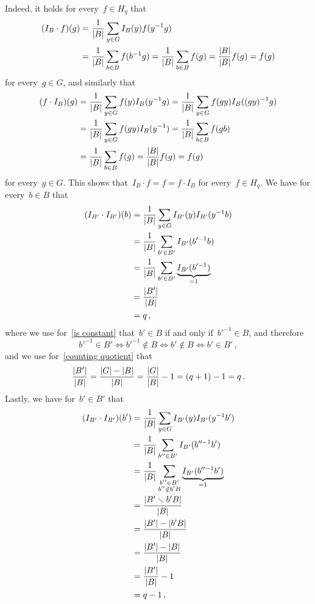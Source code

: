 Indeed, it holds for every~$f \in H_q$ that
\begin{align*}
      (I_B \cdot f)(g)
  &=  \frac{1}{\lvert B\rvert}
      \sum_{y \in G}
      I_B(y) f(y^{-1} g)  \\
  &=  \frac{1}{\lvert B\rvert}
      \sum_{b \in B}
      f(b^{-1} g)
   =  \frac{1}{\lvert B\rvert}
      \sum_{b \in B}
      f(g)
   =  \frac{\lvert B\rvert}{\lvert B\rvert} f(g)
   =  f(g)
\end{align*}
for every~$g \in G$, and similarly that
\begin{align*}
      (f \cdot I_B)(g)
  &=  \frac{1}{\lvert B\rvert}
      \sum_{y \in G}
      f(y) I_B(y^{-1} g)
   =  \frac{1}{\lvert B\rvert}
      \sum_{y \in G}
      f(gy) I_B((gy)^{-1} g)  \\
  &=  \frac{1}{\lvert B\rvert}
      \sum_{y \in G}
      f(gy) I_B(y^{-1})
   =  \frac{1}{\lvert B\rvert}
      \sum_{b \in B}
      f(gb) \\
   &= \frac{1}{\lvert B\rvert}
      \sum_{b \in B}
      f(g)
   =  \frac{\lvert B\rvert}{\lvert B\rvert} f(g)
   =  f(g)
\end{align*}
for every~$g \in G$.
This shows that~$I_B \cdot f = f = f \cdot I_B$ for every~$f \in H_q$.
We have for every~$b \in B$ that
\begin{align}
      (I_{B'} \cdot I_{B'})(b)
  &=  \frac{1}{\lvert B\rvert}
      \sum_{y \in G}
      I_{B'}(y) I_{B'}(y^{-1} b)  \notag  \\
  &=  \frac{1}{\lvert B\rvert}
      \sum_{b' \in B'}
      I_{B'}(b'^{-1} b) \notag  \\
  &=  \frac{1}{\lvert B\rvert}
      \sum_{b' \in B'}
      \underbrace{I_{B'}(b'^{-1})}_{=1} \notag  \\
  &=  \frac{\lvert B'\rvert}{\lvert B\rvert}  \label{is constant} \\
  &=  q \label{counting quotient} \,,
\end{align}
where we use for~\eqref{is constant} that~$b' \in B$ if and only if~$b'^{-1} \in B$, and therefore
\[
        b'^{-1} \in B'
  \iff  b'^{-1} \notin B
  \iff  b' \notin B
  \iff  b' \in B' \,,
\]
and we use for~\eqref{counting quotient} that
\[
    \frac{\lvert B'\rvert}{\lvert B\rvert}
  = \frac{\lvert G\rvert - \lvert B\rvert}{\lvert B\rvert}
  = \frac{\lvert G\rvert}{\lvert B\rvert} - 1
  = (q + 1) - 1
  = q \,.
\]
Lastly, we have for~$b' \in B'$ that
\begingroup
\allowdisplaybreaks
\begin{align}
      (I_{B'} \cdot I_{B'})(b')
  &=  \frac{1}{\lvert B\rvert}
      \sum_{y \in G}
      I_{B'}(y) I_{B'}(y^{-1} b') \notag  \\
  &=  \frac{1}{\lvert B\rvert}
      \sum_{b'' \in B'}
      I_{B'}(b''^{-1} b') \notag  \\
  &=  \frac{1}{\lvert B\rvert}
      \sum_{\substack{b'' \in B' \\ b'' \notin b' B}}
      \underbrace{I_{B'}(b''^{-1} b')}_{=1} \label{change sum}  \\
  &=  \frac{\lvert B' \smallsetminus b' B\rvert}{\lvert B\rvert}  \notag  \\
  &=  \frac{\lvert B'\rvert - \lvert b' B\rvert}{\lvert B\rvert} \label{difference}  \\
  &=  \frac{\lvert B'\rvert - \lvert B\rvert}{\lvert B\rvert} \notag  \\
  &=  \frac{\lvert B'\rvert}{\lvert B\rvert} - 1  \notag  \\
  &=  q - 1 \notag  \,,
\end{align}
